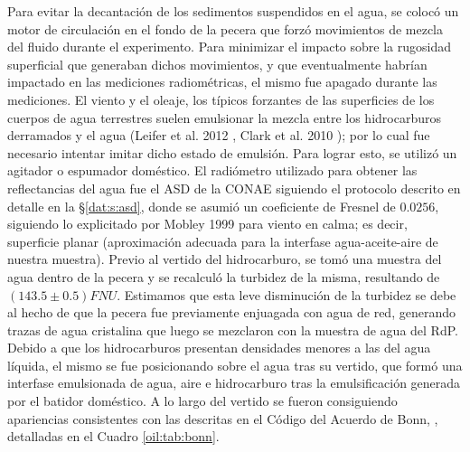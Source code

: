     Para evitar la decantación de los sedimentos suspendidos en el agua, se colocó un motor de circulación en el fondo de la pecera que forzó movimientos de mezcla del fluido durante el experimento. Para minimizar el impacto sobre la rugosidad superficial que generaban dichos movimientos, y que eventualmente habrían impactado en las mediciones radiométricas, el mismo fue apagado durante las mediciones. El viento y el oleaje, los típicos forzantes de las superficies de los cuerpos de agua terrestres suelen emulsionar la mezcla entre los hidrocarburos derramados y el agua (Leifer et al. 2012 \cite{leifer2012}, Clark et al. 2010 \cite{clark2010}); por lo cual fue necesario intentar imitar dicho estado de emulsión. Para lograr esto, se utilizó un agitador o espumador doméstico.
    El radiómetro utilizado para obtener las reflectancias del agua fue el ASD de la CONAE siguiendo el protocolo descrito en detalle en la \S \ref{dat:s:asd}, donde se asumió un coeficiente de Fresnel de $0.0256$, siguiendo lo explicitado por Mobley 1999 \cite{mobley1999} para viento en calma; es decir, superficie planar (aproximación adecuada para la interfase agua-aceite-aire de nuestra muestra). Previo al vertido del hidrocarburo, se tomó una muestra del agua dentro de la pecera y se recalculó la turbidez de la misma, resultando de $(143.5\pm0.5) FNU$. Estimamos que esta leve disminución de la turbidez se debe al hecho de que la pecera fue previamente enjuagada con agua de red, generando trazas de agua cristalina que luego se mezclaron con la muestra de agua del RdP.
    Debido a que los hidrocarburos presentan densidades menores a las del agua líquida, el mismo se fue posicionando sobre el agua tras su vertido, que formó una interfase emulsionada de agua, aire e hidrocarburo tras la emulsificación generada por el batidor doméstico. A lo largo del vertido se fueron consiguiendo apariencias consistentes con las descritas en el Código del Acuerdo de Bonn, \cite{bonn2004}, detalladas en el Cuadro \ref{oil:tab:bonn}.
    
